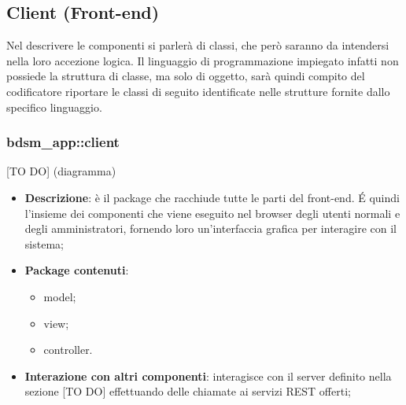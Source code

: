 %


\subsection{Client (Front-end)} %
\label{sub:client}
Nel descrivere le componenti si parlerà di classi, che però saranno da intendersi nella loro accezione logica. Il linguaggio di programmazione impiegato infatti non possiede la struttura di classe, ma solo di oggetto, sarà quindi compito del codificatore riportare le classi di seguito identificate nelle strutture fornite dallo specifico linguaggio.

	\subsubsection{bdsm\_app::client} %
	\label{ssub:bdsm_app_client}
	[TO DO] (diagramma) \newline \newline
	
	\begin{itemize}
		\item \textbf{Descrizione}: è il package che racchiude tutte le parti del front-end. \'E quindi l'insieme dei componenti che viene eseguito nel browser degli utenti normali e degli amministratori, fornendo loro un'interfaccia grafica per interagire con il sistema;
		\item \textbf{Package contenuti}:
			\begin{itemize}
				\item model;
				\item view;
				\item controller.
			\end{itemize}
		\item \textbf{Interazione con altri componenti}: interagisce con il server definito nella sezione [TO DO] effettuando delle chiamate ai servizi REST offerti;
	\end{itemize}

